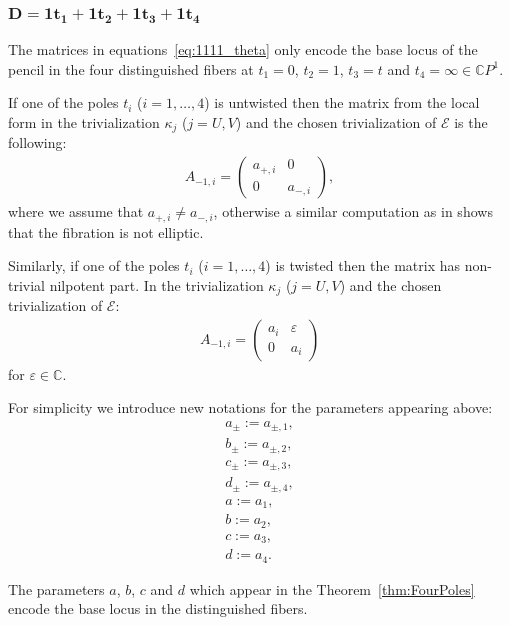 \documentclass[pdftex]{sigma}
\newcommand{\C}{{\mathbb C}} %
\newcommand{\CP}[1]{\mathbb{C}P^{#1}} %
\newcommand{\E}{{\mathcal E}} %
\numberwithin{equation}{section}
\begin{document}
\subsubsection[$D=1t_1+1t_2+1t_3+1t_4$]{$\boldsymbol{D=1t_1+1t_2+1t_3+1t_4}$}\label{sssec:1111}
The matrices in equations~\eqref{eq:1111_theta} only encode the base
locus of the pencil in the four distinguished fibers at $t_1=0$, $t_2=1$,
$t_3=t$ and $t_4=\infty \in \CP{1}$.

If one of the poles $t_i$ ($i=1,\dots, 4$) is untwisted then the
matrix from the local form in the trivialization $\kappa_j$ ($j=U,V$) and
the chosen trivialization of $\E$ is the following:
\begin{gather}\label{eq:4poles_ut_u}
 A_{-1,i} = \begin{pmatrix}
 a_{+,i} & 0 \\
 0 & a_{-,i}
 \end{pmatrix},
\end{gather}
where we assume that $a_{+,i}\neq a_{-,i}$, otherwise a similar
 computation as in \cite[Lemma~5.6]{ISS2} shows that the fibration is
 not elliptic.

Similarly, if one of the poles $t_i$ ($i=1,\dots, 4$) is twisted then the
matrix has non-trivial nilpotent part. In the trivialization $\kappa_j$ ($j=U,V$) and the chosen trivialization of $\E$:
\begin{gather}\label{eq:4poles_t_u}
 A_{-1,i} = \begin{pmatrix}
 a_{i} & \varepsilon \\
 0 & a_{i}
 \end{pmatrix}
 \end{gather}
for $\varepsilon \in \C$.

For simplicity we introduce new notations for the parameters appearing above:
\begin{subequations}\label{eq:abcd}
\begin{gather}
a_\pm:= a_{\pm,1}, \\
b_\pm:= a_{\pm,2}, \\
c_\pm:= a_{\pm,3}, \\
d_\pm:= a_{\pm,4}, \\
a:= a_{1}, \\
b:= a_{2}, \\
c:= a_{3}, \\
d:= a_{4}.
\end{gather}
\end{subequations}

The parameters $a$, $b$, $c$ and $d$ which appear in the Theorem~\ref{thm:FourPoles} encode the base locus in the distinguished
fibers.
\end{document}
